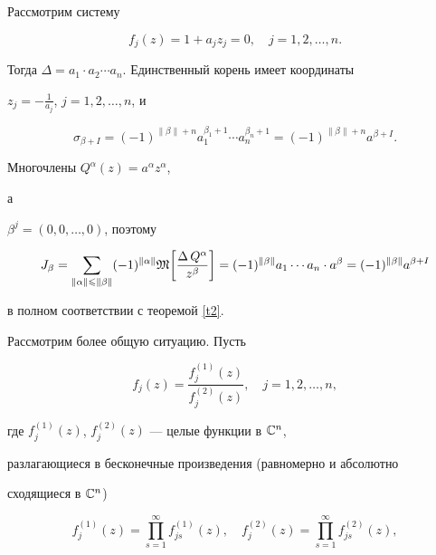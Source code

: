 \begin{exam}


Рассмотрим систему


$$


f_j(z)=1+a_jz_j=0, \quad j=1,2,\dotsc, n.


$$


Тогда $\Delta=a_1\cdot a_2\dotsb a_n$. Единственный корень имеет координаты


$z_j=-\frac 1{a_j}$, $j=1,2,\dotsc, n$, и


$$


\sigma_{\beta+I}=(-1)^{\|\beta\|+n} a_1^{\beta_1+1}\dotsb


a_n^{\beta_n+1}=(-1)^{\|\beta\|+n}a^{\beta+I}.


$$


Многочлены $Q^\alpha(z)=a^\alpha z^\alpha$,


а


$\beta^j=(0,0,\dotsc,0)$, поэтому


$$


J_\beta=\sum_{\|\alpha\|\leqslant\|\beta\|}(-1)^{\|\alpha\|}\frak{M}


\bigg[\frac{\Delta \, Q^\alpha}{z^\beta}\bigg]=


(-1)^{\|\beta\|}a_1\dotsb a_n\cdot a^\beta=(-1)^{\|\beta\|} a^{\beta +I}


$$


в полном соответствии с теоремой \ref{t2}.


\end{exam}





Рассмотрим более общую ситуацию. Пусть


\begin{equation}\label{f10}


f_j(z)=\frac{f^{(1)}_j(z)}{f^{(2)}_j(z)},\quad j=1,2,\dotsc, n,


\end{equation}


где $f^{(1)}_j(z)$, $f^{(2)}_j(z)$ --- целые функции в $\Bbb C^n$, 


разлагающиеся в бесконечные произведения (равномерно и абсолютно 


сходящиеся в $\Bbb C^n$)


$$


f^{(1)}_j(z)=\prod_{s=1}^\infty f^{(1)}_{js}(z),\quad f^{(2)}_{j}(z)=


\prod_{s=1}^\infty f^{(2)}_{js}(z),


$$


